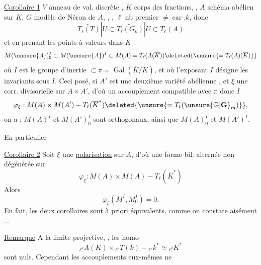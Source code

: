 \uline{Corollaire 1} $V$ anneau de val. discrète , $K$ corps des fractions, , $A$ schéma abélien sur $K$, $G$ modèle de Néron de $A$, , , $\ell$ nb premier $\ne\operatorname{car}.k$,  donc
\[
\widetilde{T_\ell(T)}|U\subset\widetilde{T_\ell(G_k)}|U\subset T_\ell(A)
\]
et en prenant les points à valeurs dans $\overline K$
\[
M(\unsure{A})_0^I\subset M(\unsure{A})^I\subset M(A)=T_\ell(A(\overline K))\deleted{\unsure{=T_\ell(A)(\overline K)}}
\]
où $I$ est le groupe d'inertie $\subset\pi=\operatorname{Gal}(\overline K/K)$, et où l'exposant $I$ désigne les invariants sous $I$.
Ceci posé, si $A'$ est une deuxième variété abélienne , et $\xi$ une  corr. divisorielle sur $A\times A'$, d'où un accouplement compatible avec $\pi$ donc $I$
\[
\varphi_\xi:M(A)\times M(A')\mathbin{-}T_\ell(\overline K^*)\deleted{\unsure{=T_\ell(\unsure{\mathbb G|\mathbf G}_m)}},
\]
on a :  $M(A)^I$ et $M(A')_0^I$ sont orthogonaux, ainsi que $M(A)_0^I$ et $M(A')^I$.

En particulier

\uline{Corollaire 2} Soit $\xi$ une \uline{polarisation} sur $A$, d'où une forme bil. alternée non dégénérée sur
\[
\varphi_\xi:M(A)\times M(A)\mathbin{-}T_\ell(\overline K^*)
\]
Alors
\[
\varphi_\xi(M^I,M_0^I)=0.
\]
En fait, les deux corollaires sont à priori équivalents, comme on constate aisément $\ldots$

\uline{Remarque} A la limite projective, , les homo
\[
{}_{\ell^\nu}A(K)\times{}_{\ell^\nu}T(k)\mathbin{-}{}_{\ell^\nu}k^*\simeq{}_{\ell^\nu}K^*
\]
sont nuls. Cependant les accouplements eux-mêmes ne
